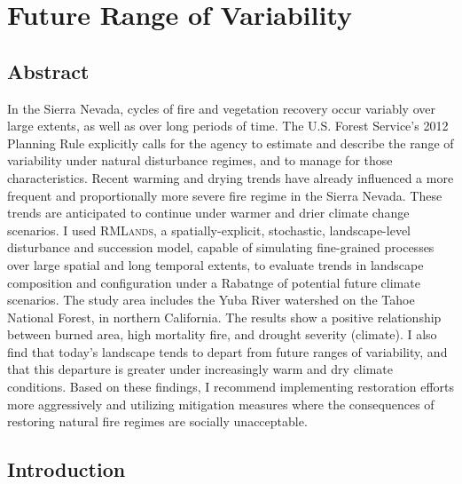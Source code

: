 
\chapter{Future Range of Variability}
\label{ch:FRV}

\section{Abstract}
In the Sierra Nevada, cycles of fire and vegetation recovery occur variably over large extents, as well as over long periods of time. The U.S. Forest Service's 2012 Planning Rule explicitly calls for the agency to estimate and describe the range of variability under natural disturbance regimes, and to manage for those characteristics. Recent warming and drying trends have already influenced a more frequent and proportionally more severe fire regime in the Sierra Nevada. These trends are anticipated to continue under warmer and drier climate change scenarios. I used \textsc{RMLands}, a spatially-explicit, stochastic, landscape-level disturbance and succession model, capable of simulating fine-grained processes over large spatial and long temporal extents, to evaluate trends in landscape composition and configuration under a Rabatnge of potential future climate scenarios. The study area includes the Yuba River watershed on the Tahoe National Forest, in northern California. The results show a positive relationship between burned area, high mortality fire, and drought severity (climate). I also find that today's landscape tends to depart from future ranges of variability, and that this departure is greater under increasingly warm and dry climate conditions. Based on these findings, I recommend implementing restoration efforts more aggressively and utilizing mitigation measures where the consequences of restoring natural fire regimes are socially unacceptable.



\section{Introduction}

